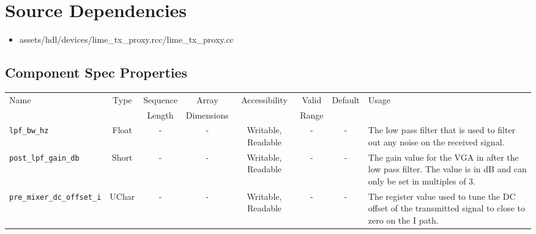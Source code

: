 \documentclass{article}
\begin{document}
\section*{Source Dependencies}
\begin{itemize}
	\item assets/hdl/devices/lime\_tx\_proxy.rcc/lime\_tx\_proxy.cc
\end{itemize}

\begin{landscape}
	\section*{Component Spec Properties}
	\begin{scriptsize}
		\begin{tabular}{|p{3cm}|c|c|c|c|c|c|p{10cm}|}
			\hline
			\rowcolor{blue}
			Name                         & Type   & Sequence & Array      & Accessibility       & Valid & Default & Usage                                                                                                                                                                                                                       \\
			\rowcolor{blue}
			                             &        & Length   & Dimensions &                     & Range &         &                                                                                                                                                                                                                             \\
			\hline
			\verb+lpf_bw_hz+             & Float  & -        & -          & Writable, Readable  & -     & -       & The low pass filter that is used to filter out any noise on the received signal.                                                                                                                                            \\
			\hline
			\verb+post_lpf_gain_db+      & Short  & -        & -          & Writable, Readable  & -     & -       & The gain value for the VGA in after the low pass filter. The value is in dB and can only be set in multiples of 3.                                                                                                          \\
			\hline
			\verb+pre_mixer_dc_offset_i+ & UChar  & -        & -          & Writable, Readable  & -     & -       & The register value used to tune the DC offset of the transmitted signal to close to zero on the I path.                                                                                                                     \\

\end{tabular}
\end{scriptsize}
\end{landscape}
\end{document}
